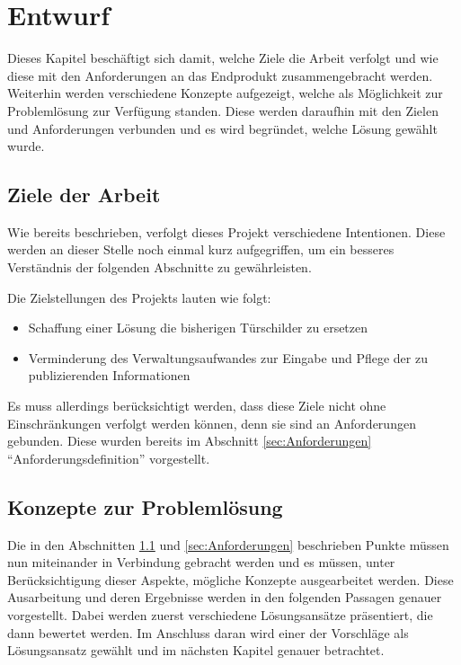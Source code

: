 \chapter{ Entwurf }
\vspace{-3cm}
\begin{flushleft}
Dieses Kapitel beschäftigt sich damit, welche Ziele die Arbeit verfolgt und wie diese mit den Anforderungen an das Endprodukt zusammengebracht werden. Weiterhin werden verschiedene Konzepte aufgezeigt, welche als Möglichkeit zur Problemlösung zur Verfügung standen. Diese werden daraufhin mit den Zielen und Anforderungen verbunden und es wird begründet, welche Lösung gewählt wurde.

\section{Ziele der Arbeit}\label{sec:Ziele der Arbeit}
Wie bereits beschrieben, verfolgt dieses Projekt verschiedene Intentionen. Diese werden an dieser Stelle noch einmal kurz aufgegriffen, um ein besseres Verständnis der folgenden Abschnitte zu gewährleisten.
\newline

Die Zielstellungen des Projekts lauten wie folgt:
\begin{itemize}
  \item Schaffung einer Lösung die bisherigen Türschilder zu ersetzen
  \item Verminderung des Verwaltungsaufwandes zur Eingabe und Pflege der zu publizierenden Informationen
\end{itemize}

Es muss allerdings berücksichtigt werden, dass diese Ziele nicht ohne Einschränkungen verfolgt werden können, denn sie sind an Anforderungen gebunden. Diese wurden bereits im Abschnitt \ref{sec:Anforderungen} ``Anforderungsdefinition'' vorgestellt.

\section{Konzepte zur Problemlösung}
Die in den Abschnitten \ref{sec:Ziele der Arbeit} und \ref{sec:Anforderungen} beschrieben Punkte müssen nun miteinander in Verbindung gebracht werden und es müssen, unter Berücksichtigung dieser Aspekte, mögliche Konzepte ausgearbeitet werden.
Diese Ausarbeitung und deren Ergebnisse werden in den folgenden Passagen genauer vorgestellt. Dabei werden zuerst verschiedene Lösungsansätze präsentiert, die dann bewertet werden. Im Anschluss daran wird einer der Vorschläge als Lösungsansatz gewählt und im nächsten Kapitel genauer betrachtet.


\end{flushleft}
